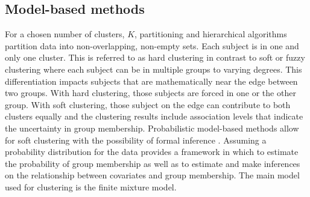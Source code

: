 \subsection{Model-based methods}
For a chosen number of clusters, $K$, partitioning and hierarchical algorithms partition data into non-overlapping, non-empty sets. Each subject is in one and only one cluster. This is referred to as hard clustering in contrast to soft or fuzzy clustering where each subject can be in multiple groups to varying degrees. This differentiation impacts subjects that are mathematically near the edge between two groups. With hard clustering, those subjects are forced in one or the other group. With soft clustering, those subject on the edge can contribute to both clusters equally and the clustering results include association levels that indicate the uncertainty in group membership. Probabilistic model-based methods allow for soft clustering with the possibility of formal inference \cite{fraley2002}. Assuming a probability distribution for the data provides a framework in which to estimate the probability of group membership as well as to estimate and make inferences on the relationship between covariates and group membership. The main model used for clustering is the finite mixture model.

